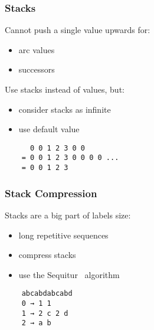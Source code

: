 \documentclass[english]{beamer}
\begin{document}
\begin{frame}[fragile]
  \frametitle{Stacks}
  Cannot push a single value upwards for:
  \begin{itemize}
    \item arc values
    \item successors
  \end{itemize}

  Use stacks instead of values, but:
  \begin{itemize}
    \item consider stacks as infinite
    \item use default value
  \end{itemize}

  \begin{verbatim}
      0 0 1 2 3 0 0
    = 0 0 1 2 3 0 0 0 0 ...
    = 0 0 1 2 3
  \end{verbatim}
\end{frame}

\begin{frame}[fragile]
  \frametitle{Stack Compression}
  Stacks are a big part of labels size:
  \begin{itemize}
    \item long repetitive sequences
    \item compress stacks
    \item use the Sequitur~\cite{1997-nevill-0} algorithm
  \end{itemize}
  \begin{verbatim}
    abcabdabcabd
    0 → 1 1
    1 → 2 c 2 d
    2 → a b
  \end{verbatim}
\end{frame}
\end{document}
